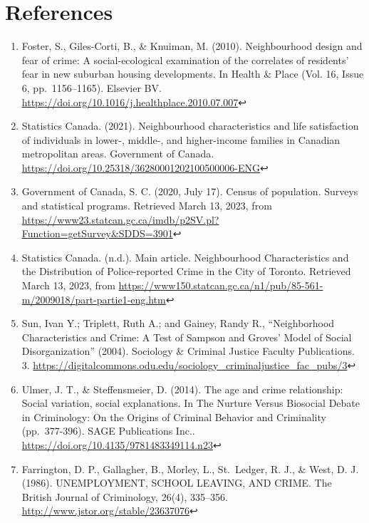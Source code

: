\documentclass[
]{article}
\begin{document}
\hypertarget{references}{%
\section{References}\label{references}}

\begin{enumerate}
\def\labelenumi{\arabic{enumi}.}
\item
  Foster, S., Giles-Corti, B., \& Knuiman, M. (2010). Neighbourhood
  design and fear of crime: A social-ecological examination of the
  correlates of residents' fear in new suburban housing developments. In
  Health \& Place (Vol. 16, Issue 6, pp.~1156--1165). Elsevier BV.
  \url{https://doi.org/10.1016/j.healthplace.2010.07.007}↩︎
\item
  Statistics Canada. (2021). Neighbourhood characteristics and life
  satisfaction of individuals in lower-, middle-, and higher-income
  families in Canadian metropolitan areas. Government of Canada.
  \url{https://doi.org/10.25318/36280001202100500006-ENG}↩︎
\item
  Government of Canada, S. C. (2020, July 17). Census of population.
  Surveys and statistical programs. Retrieved March 13, 2023, from
  \url{https://www23.statcan.gc.ca/imdb/p2SV.pl?Function=getSurvey\&SDDS=3901}↩︎
\item
  Statistics Canada. (n.d.). Main article. Neighbourhood Characteristics
  and the Distribution of Police-reported Crime in the City of Toronto.
  Retrieved March 13, 2023, from
  \url{https://www150.statcan.gc.ca/n1/pub/85-561-m/2009018/part-partie1-eng.htm}↩︎
\item
  Sun, Ivan Y.; Triplett, Ruth A.; and Gainey, Randy R., ``Neighborhood
  Characteristics and Crime: A Test of Sampson and Groves' Model of
  Social Disorganization'' (2004). Sociology \& Criminal Justice Faculty
  Publications. 3.
  \url{https://digitalcommons.odu.edu/sociology_criminaljustice_fac_pubs/3}↩︎
\item
  Ulmer, J. T., \& Steffensmeier, D. (2014). The age and crime
  relationship: Social variation, social explanations. In The Nurture
  Versus Biosocial Debate in Criminology: On the Origins of Criminal
  Behavior and Criminality (pp.~377-396). SAGE Publications Inc..
  \url{https://doi.org/10.4135/9781483349114.n23}↩︎
\item
  Farrington, D. P., Gallagher, B., Morley, L., St.~Ledger, R. J., \&
  West, D. J. (1986). UNEMPLOYMENT, SCHOOL LEAVING, AND CRIME. The
  British Journal of Criminology, 26(4), 335--356.
  \url{http://www.jstor.org/stable/23637076}↩︎

\end{enumerate}
\end{document}
